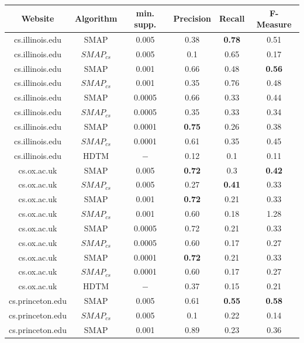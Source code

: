 
\begin{table}[t]

\centering

\begin{tabular}{|c|c|c|c|c|c|}
\hline
Website & Algorithm & min. supp. & Precision & Recall & F-Measure  \\
\hline
cs.illinois.edu & SMAP & 0.005  & 0.38 & \textbf{0.78} & 0.51 \\
cs.illinois.edu & $SMAP_{cs}$ & 0.005  &0.1	& 0.65	& 0.17 \\
cs.illinois.edu & SMAP & 0.001  & 0.66 & 0.48 & \textbf{0.56} \\
cs.illinois.edu & $SMAP_{cs}$ & 0.001  & 0.35& 0.76 & 0.48  \\
cs.illinois.edu & SMAP & 0.0005 & 0.66 & 0.33 & 0.44 \\
cs.illinois.edu & $SMAP_{cs}$ & 0.0005  & 0.35 & 0.33  & 0.34  \\
cs.illinois.edu & SMAP & 0.0001 & \textbf{0.75} & 0.26  & 0.38 \\
cs.illinois.edu & $SMAP_{cs}$ & 0.0001  & 0.61 & 0.35  & 0.45  \\
cs.illinois.edu & HDTM & $-$ &  0.12 & 0.1 & 0.11 \\
\hline
cs.ox.ac.uk &  SMAP & 0.005  & \textbf{0.72} & 0.3 & \textbf{0.42} \\
cs.ox.ac.uk &  $SMAP_{cs}$ & 0.005  & 0.27 & \textbf{0.41} & 0.33 \\
cs.ox.ac.uk &  SMAP & 0.001 & \textbf{0.72} & 0.21 & 0.33 \\
cs.ox.ac.uk &  $SMAP_{cs}$ & 0.001  & 0.60& 0.18 &1.28  \\
cs.ox.ac.uk &  SMAP & 0.0005  & 0.72 & 0.21 & 0.33 \\
cs.ox.ac.uk &  $SMAP_{cs}$ & 0.0005  & 0.60& 0.17 &0.27  \\
cs.ox.ac.uk &  SMAP & 0.0001  & \textbf{0.72} & 0.21 & 0.33 \\
cs.ox.ac.uk &  $SMAP_{cs}$ & 0.0001  & 0.60& 0.17 &0.27  \\
cs.ox.ac.uk &  HDTM & $-$ & 0.37 & 0.15 & 0.21 \\
\hline
cs.princeton.edu &  SMAP & 0.005  & 0.61 & \textbf{0.55} & \textbf{0.58} \\
cs.princeton.edu &  $SMAP_{cs}$ & 0.005  & 0.1& 0.22 & 0.14 \\
cs.princeton.edu &  SMAP & 0.001  & 0.89 & 0.23 & 0.36 \\

\end{tabular}
\end{table}
